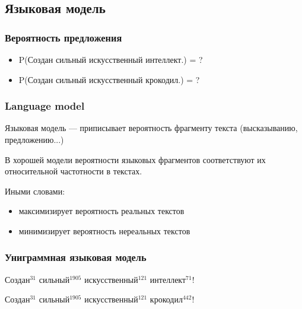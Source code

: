 \documentclass[10pt,svgnames]{beamer}
\begin{document}
\subsection{Языковая модель}

\begin{frame}
  \frametitle{Вероятность предложения}
  \LARGE
  \begin{itemize}
  \item P(Создан сильный искусственный интеллект.) = ?
  \item P(Создан сильный искусственный крокодил.) = ?
  \end{itemize}
\end{frame}

\begin{frame}
  \frametitle{Language model}
  Языковая модель — приписывает вероятность фрагменту текста
  (высказыванию, предложению...)
  
  В хорошей модели вероятности языковых фрагментов соответствуют их
  относительной частотности в текстах.

  Иными словами: 
  \begin{itemize}
  \item максимизирует вероятность реальных текстов
  \item минимизирует вероятность нереальных текстов
  \end{itemize}
\end{frame}

\begin{frame}
  \frametitle{Униграммная языковая модель}
  \begin{block}{}
    Создан\alert{$^{31}$} сильный\alert{$^{1905}$} искусственный\alert{$^{121}$} интеллект\alert{$^{71}$}!
  \end{block}
  \begin{block}{}
    Создан\alert{$^{31}$} сильный\alert{$^{1905}$} искусственный\alert{$^{121}$} крокодил\alert{$^{442}$}!
  \end{block}


\end{frame}
\end{document}
